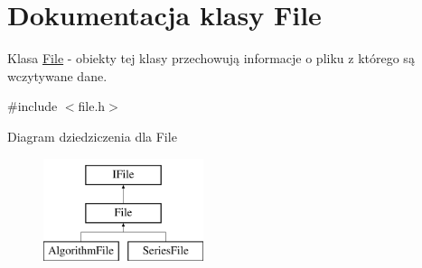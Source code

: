 \hypertarget{class_file}{\section{Dokumentacja klasy File}
\label{class_file}
}


Klasa \hyperlink{class_file}{File} -\/ obiekty tej klasy przechowują informacje o pliku z którego są wczytywane dane.  




{\ttfamily \#include $<$file.\+h$>$}

Diagram dziedziczenia dla File\begin{figure}[H]
\begin{center}
\leavevmode
\includegraphics[height=3.000000cm]{class_file}
\end{center}
\end{figure}
